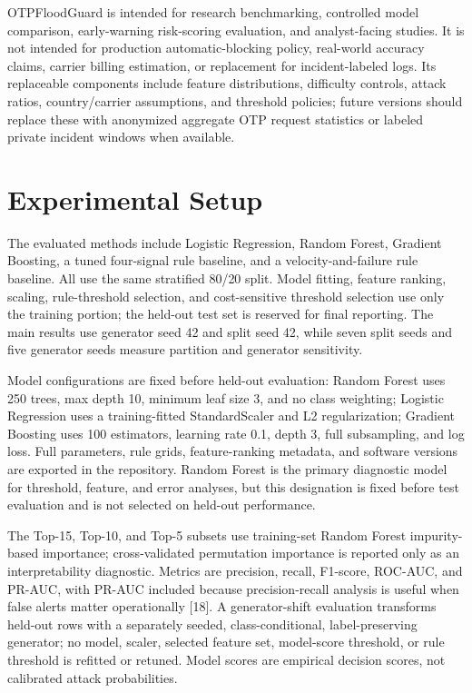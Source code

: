 \documentclass[conference]{IEEEtran}
\begin{document}
OTPFloodGuard is intended for research benchmarking, controlled model comparison, early-warning risk-scoring evaluation, and analyst-facing studies. It is not intended for production automatic-blocking policy, real-world accuracy claims, carrier billing estimation, or replacement for incident-labeled logs. Its replaceable components include feature distributions, difficulty controls, attack ratios, country/carrier assumptions, and threshold policies; future versions should replace these with anonymized aggregate OTP request statistics or labeled private incident windows when available.

\section{Experimental Setup}

The evaluated methods include Logistic Regression, Random Forest, Gradient Boosting, a tuned four-signal rule baseline, and a velocity-and-failure rule baseline. All use the same stratified 80/20 split. Model fitting, feature ranking, scaling, rule-threshold selection, and cost-sensitive threshold selection use only the training portion; the held-out test set is reserved for final reporting. The main results use generator seed 42 and split seed 42, while seven split seeds and five generator seeds measure partition and generator sensitivity.

Model configurations are fixed before held-out evaluation: Random Forest uses 250 trees, max depth 10, minimum leaf size 3, and no class weighting; Logistic Regression uses a training-fitted StandardScaler and L2 regularization; Gradient Boosting uses 100 estimators, learning rate 0.1, depth 3, full subsampling, and log loss. Full parameters, rule grids, feature-ranking metadata, and software versions are exported in the repository. Random Forest is the primary diagnostic model for threshold, feature, and error analyses, but this designation is fixed before test evaluation and is not selected on held-out performance.

The Top-15, Top-10, and Top-5 subsets use training-set Random Forest impurity-based importance; cross-validated permutation importance is reported only as an interpretability diagnostic. Metrics are precision, recall, F1-score, ROC-AUC, and PR-AUC, with PR-AUC included because precision-recall analysis is useful when false alerts matter operationally [18]. A generator-shift evaluation transforms held-out rows with a separately seeded, class-conditional, label-preserving generator; no model, scaler, selected feature set, model-score threshold, or rule threshold is refitted or retuned. Model scores are empirical decision scores, not calibrated attack probabilities.
\end{document}
